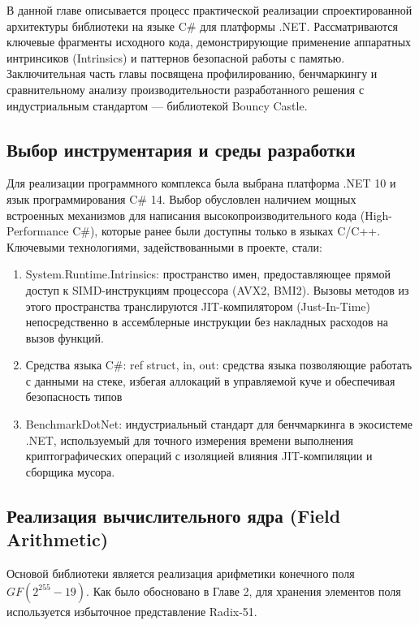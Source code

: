 В данной главе описывается процесс практической реализации спроектированной архитектуры библиотеки на языке C\# для платформы .NET. Рассматриваются ключевые фрагменты исходного кода, демонстрирующие применение аппаратных интринсиков (Intrinsics) и паттернов безопасной работы с памятью. Заключительная часть главы посвящена профилированию, бенчмаркингу и сравнительному анализу производительности разработанного решения с индустриальным стандартом — библиотекой Bouncy Castle.

\subsection{Выбор инструментария и среды разработки}

Для реализации программного комплекса была выбрана платформа .NET 10 и язык программирования C\# 14. Выбор обусловлен наличием мощных встроенных механизмов для написания высокопроизводительного кода (High-Performance C\#), которые ранее были доступны только в языках C/C++. Ключевыми технологиями, задействованными в проекте, стали:

\begin{enumerate}
    \item System.Runtime.Intrinsics: пространство имен, предоставляющее прямой доступ к SIMD-инструкциям процессора (AVX2, BMI2). Вызовы методов из этого пространства транслируются JIT-компилятором (Just-In-Time) непосредственно в ассемблерные инструкции без накладных расходов на вызов функций.
    \item Средства языка C#: ref struct, in, out: средства языка позволяющие работать с данными на стеке, избегая аллокаций в управляемой куче и обеспечивая безопасность типов
    \item BenchmarkDotNet: индустриальный стандарт для бенчмаркинга в экосистеме .NET, используемый для точного измерения времени выполнения криптографических операций с изоляцией влияния JIT-компиляции и сборщика мусора.
\end{enumerate}

\subsection{Реализация вычислительного ядра (Field Arithmetic)}

Основой библиотеки является реализация арифметики конечного поля $GF(2^{255}-19)$. Как было обосновано в Главе 2, для хранения элементов поля используется избыточное представление Radix-51.

